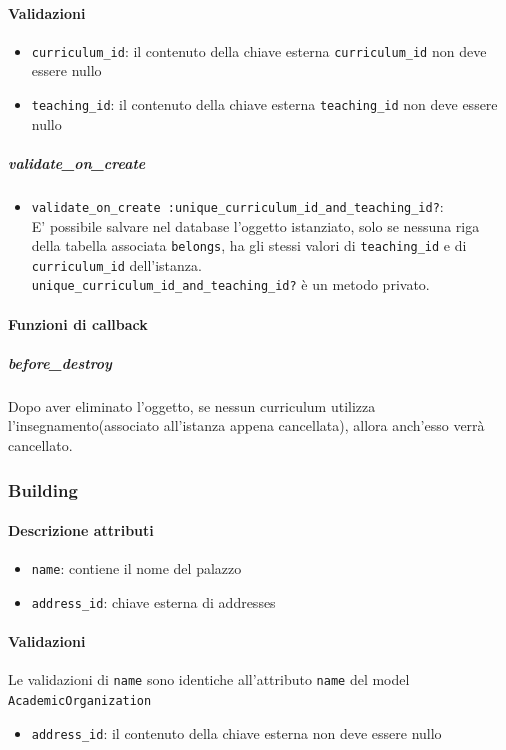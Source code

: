\documentclass[11pt,a4paper]{article}
\begin{document}
\paragraph{Validazioni}
\begin{itemize}
 \item \verb|curriculum_id|: il contenuto della chiave esterna \verb|curriculum_id| non deve essere nullo 
 \item \verb|teaching_id|: il contenuto della chiave esterna \verb|teaching_id| non deve essere nullo
\end{itemize}
\subparagraph{validate\_on\_create}
\begin{itemize}
 \item \verb|validate_on_create :unique_curriculum_id_and_teaching_id?|: \\E' possibile salvare nel database l'oggetto istanziato, solo se nessuna riga della tabella associata \verb|belongs|, ha gli stessi valori di \verb|teaching_id| e di \verb|curriculum_id| dell'istanza.\\
 \verb|unique_curriculum_id_and_teaching_id?| è un metodo privato.
\end{itemize}
\paragraph{Funzioni di callback}
\subparagraph{before\_destroy}
Dopo aver eliminato l'oggetto, se nessun curriculum utilizza l'insegnamento(associato all'istanza appena cancellata), allora anch'esso verrà cancellato.
\subsubsection{Building}
\paragraph{Descrizione attributi}
\begin{itemize}
 \item \verb|name|: contiene il nome del palazzo
 \item \verb|address_id|: chiave esterna di addresses	
\end{itemize}
\paragraph{Validazioni}
Le validazioni di \verb|name| sono identiche all'attributo \verb|name| del model \verb|AcademicOrganization|
\begin{itemize}
 \item \verb|address_id|: il contenuto della chiave esterna non deve essere nullo
\end{itemize}
\end{document}

